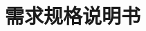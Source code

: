 \documentclass[11pt, a4paper, onecolumn]{ctexart}
\begin{document}
\title{需求规格说明书}


\maketitle

\tableofcontents

\newpage











\end{document}
